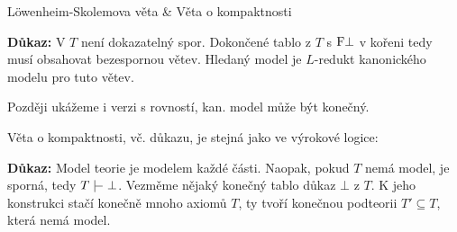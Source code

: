 \documentclass{beamer}
\begin{document}
\begin{frame}{Löwenheim-Skolemova věta \& Věta o kompaktnosti}
    

    \textbf{Důkaz:} V $T$ není dokazatelný spor. Dokončené tablo z $T$ s $\mathrm{F}\bot$ v kořeni tedy musí obsahovat bezespornou větev. Hledaný model je $L$-redukt kanonického modelu pro tuto větev.\hfill\qedsymbol

    Později ukážeme i verzi s rovností, kan. model může být konečný.

    \bigskip

    Věta o kompaktnosti, vč. důkazu, je stejná jako ve výrokové logice:

    \smallskip
    
    \textbf{Důkaz:} Model teorie je modelem každé části. Naopak, pokud $T$ nemá model, je sporná, tedy $T\proves\bot$. Vezměme nějaký \alert{konečný} tablo důkaz $\bot$ z $T$. K jeho konstrukci stačí konečně mnoho axiomů $T$, ty tvoří konečnou podteorii $T'\subseteq T$, která nemá model.\hfill\qedsymbol

\end{frame}
\end{document}
